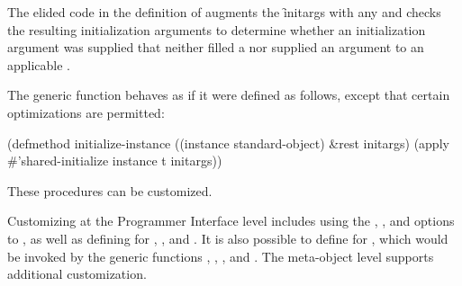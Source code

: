 The elided code in the definition of  
augments the \f{initargs} with any  and
checks the
resulting
initialization arguments to determine whether an initialization
argument was supplied that neither filled a  nor supplied an argument
to an applicable . 
                      
The generic function  behaves as if it were
defined as follows, except that certain optimizations are permitted:

\code
 (defmethod initialize-instance ((instance standard-object) &rest initargs)
   (apply #'shared-initialize instance t initargs))
\endcode

These procedures can be customized.
                                                                  
Customizing at the Programmer Interface level includes using the 
, , and  options to
, as well as defining 
for , 
,
and .  It is also possible to define
 for , which would be invoked by the
generic functions , 
, 
, and 
.  
The meta-object level supports additional
customization.
                                                                
